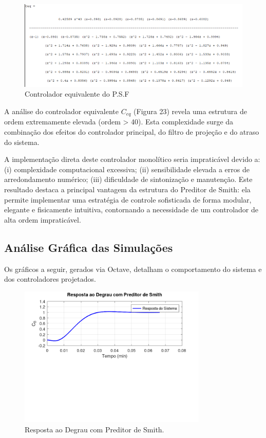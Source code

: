 \documentclass[a4paper,12pt]{article}
\begin{document}
\begin{figure} [H]
    \centering
    \includegraphics[width=0.9\linewidth]{image11.png}
    \caption{Controlador equivalente do P.S.F}
    \label{fig:psf_equivalent_controller}
\end{figure}

A análise do controlador equivalente $C_{eq}$ (Figura 23) revela uma estrutura de ordem extremamente elevada (ordem > 40). Esta complexidade surge da combinação dos efeitos do controlador principal, do filtro de projeção e do atraso do sistema.

A implementação direta deste controlador monolítico seria impraticável devido a: (i) complexidade computacional excessiva; (ii) sensibilidade elevada a erros de arredondamento numérico; (iii) dificuldade de sintonização e manutenção. Este resultado destaca a principal vantagem da estrutura do Preditor de Smith: ela permite implementar uma estratégia de controle sofisticada de forma modular, elegante e fisicamente intuitiva, contornando a necessidade de um controlador de alta ordem impraticável.

\subsection{Análise Gráfica das Simulações}
Os gráficos a seguir, gerados via Octave, detalham o comportamento do sistema e dos controladores projetados.

\begin{figure}[H]
    \centering
    \includegraphics[width=0.8\textwidth]{figura_resposta_degrau.png}
    \caption{Resposta ao Degrau com Preditor de Smith.}
    \label{fig:resposta_degrau}
\end{figure}
\end{document}
